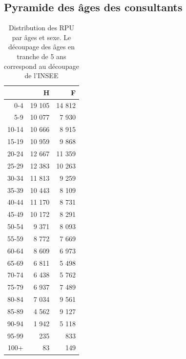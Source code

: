 \documentclass[12pt,english,french,twoside]{book}\usepackage[]{graphicx}\usepackage[]{color}
\begin{document}
\subsection*{Pyramide des âges des consultants}

\begin{table}[ht]
\centering
\begin{tabular}{rrr}
  \hline
 & H & F \\ 
  \hline
0-4 & 19 105 & 14 812 \\ 
  5-9 & 10 077 & 7 930 \\ 
  10-14 & 10 666 & 8 915 \\ 
  15-19 & 10 959 & 9 868 \\ 
  20-24 & 12 667 & 11 359 \\ 
  25-29 & 12 383 & 10 263 \\ 
  30-34 & 11 813 & 9 259 \\ 
  35-39 & 10 443 & 8 109 \\ 
  40-44 & 11 170 & 8 731 \\ 
  45-49 & 10 172 & 8 291 \\ 
  50-54 & 9 371 & 8 093 \\ 
  55-59 & 8 772 & 7 669 \\ 
  60-64 & 8 609 & 6 973 \\ 
  65-69 & 6 811 & 5 498 \\ 
  70-74 & 6 438 & 5 762 \\ 
  75-79 & 6 937 & 7 489 \\ 
  80-84 & 7 034 & 9 561 \\ 
  85-89 & 4 562 & 9 127 \\ 
  90-94 & 1 942 & 5 118 \\ 
  95-99 & 235 & 833 \\ 
  100+ &  83 & 149 \\ 
   \hline
\end{tabular}
\caption[Répartition par âges et sexe]{Distribution des RPU par âges et sexe. Le découpage des âges en tranche de 5 ans correspond au découpage de l'INSEE} 
\label{tab:age_sexe}
\end{table}


\end{document}
